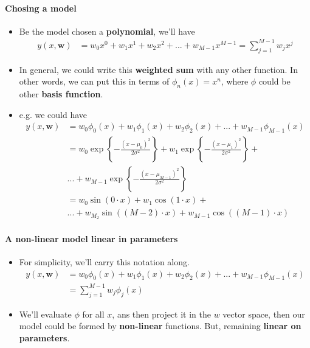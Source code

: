 \begin{frame}{\insertsubsection}
	\framesubtitle{Chosing a model}
	\begin{itemize}
		\item Be the model chosen a \textcolor{UniOrange}{\textbf{polynomial}}, we'll have
		\begin{align*}
			y(x,\mathbf{w}) &= w_0x^0 + w_1x^1 + w_2x^2  + ... + w_{M-1}x^{M-1}  = \sum^{M-1}_{j=1} w_j x^j
		\end{align*}	
		\item In general, we could write this \textcolor{UniOrange}{\textbf{weighted sum}} with any other function. In other words, we can put this in terms of $\phi_n(x)=x^n$, where $\phi$ could be other \textcolor{UniOrange}{\textbf{basis function}}.
		\item e.g. we could have
		\begin{align*}
			y(x,\mathbf{w}) &= w_0 \phi_0(x) +w_1 \phi_1(x) +w_2 \phi_2(x)  + ... + w_{M-1} \phi_{M-1}(x) \\
							&= w_0 \exp\left\{ - \frac{(x-\mu_0)^2}{2\sigma^2}\right\} + w_1  \exp\left\{ - \frac{(x-\mu_1)^2}{2\sigma^2}\right\} + \\ & ... + w_{M-1} \exp\left\{ - \frac{(x-\mu_{M-1})^2}{2\sigma^2}\right\} \\
							&= w_0 \sin(0 \cdot x) + w_1 \cos(1 \cdot x) + \\ &... + w_{M_2} \sin((M-2) \cdot x) + w_{M-1} \cos((M-1) \cdot x)
		\end{align*}

\end{itemize}
\end{frame}

\begin{frame}{\insertsubsection}
	\framesubtitle{A non-linear model linear in parameters}
	\begin{itemize}
		\item For simplicity, we'll carry this notation along.
		\begin{align*}
			y(x,\mathbf{w}) &= w_0 \phi_0(x) +w_1 \phi_1(x) +w_2 \phi_2(x)  + ... + w_{M-1} \phi_{M-1}(x) \\
							&= \sum^{M-1}_{j=1} w_j \phi_j(x)
		\end{align*}
		\item We'll evaluate $\phi$ for all $x$, ans then project it in the $w$ vector space, then our model could be formed by \textcolor{UniOrange}{\textbf{non-linear}} functions. But, remaining \textcolor{UniOrange}{\textbf{linear on parameters}}.
	\end{itemize}
\end{frame}


